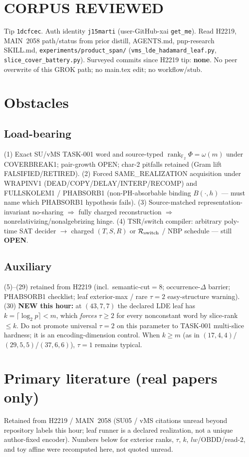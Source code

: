 \documentclass[11pt]{article}
\begin{document}
\section*{CORPUS REVIEWED}
Tip \texttt{1dcfcec}. Auth identity \texttt{j15marti} (user-GitHub-xai \texttt{get\_me}).
Read H2219, MAIN~2058 path/status from prior distill, AGENTS.md, pnp-research SKILL.md,
\texttt{experiments/product\_span/} (\texttt{vms\_lde\_hadamard\_leaf.py},
\texttt{slice\_cover\_battery.py}).
Surveyed commits since H2219 tip: \textbf{none}.
No peer overwrite of this GROK path; no main.tex edit; no workflow/stub.

\section*{Obstacles}
\subsection*{Load-bearing}
(1) Exact SU/vMS TASK-001 word and source-typed
$\operatorname{rank}_{\mathbb F_2}\Phi=\omega(m)$ under COVERBREAK1; pair-growth OPEN;
char-$2$ pitfalls retained (Gram lift FALSIFIED/RETIRED).
(2) Forced SAME\_REALIZATION acquisition under WRAPINV1
(DEAD/COPY/DELAY/INTERP/RECOMP) and FULLSKOLEM1 / PHABSORB1
(non-PH-absorbable binding $B(\cdot,h)$ --- must name which PHABSORB1 hypothesis fails).
(3) Source-matched representation-invariant no-sharing $\Rightarrow$ fully charged reconstruction
$\Rightarrow$ nonrelativizing/nonalgebrizing hinge.
(4) TSR/switch compiler: arbitrary poly-time SAT decider $\to$ charged $(T,S,R)$ or
$\mathcal R_{\rm switch}$ / NBP schedule --- still \textbf{OPEN}.

\subsection*{Auxiliary}
(5)--(29) retained from H2219 (incl.\ semantic-cut$=8$; occurrence-$\Delta$ barrier;
PHABSORB1 checklist; leaf exterior-max / rare $\tau{=}2$ easy-structure warning).
(30) \textbf{NEW this hour:} at $(43,7,7)$ the declared LDE leaf has
$k=\lceil\log_2 p\rceil < m$, which \emph{forces} $\tau\ge 2$ for every nonconstant word
by slice-rank $\le k$. Do not promote universal $\tau{=}2$ on this parameter to
TASK-001 multi-slice hardness; it is an encoding-dimension control. When $k\ge m$
(as in $(17,4,4)$/$(29,5,5)$/$(37,6,6)$), $\tau{=}1$ remains typical.

\section*{Primary literature (real papers only)}
Retained from H2219 / MAIN~2058 (SU05 / vMS citations unread beyond repository labels this hour;
leaf runner is a declared realization, not a unique author-fixed encoder).
Numbers below for exterior ranks, $\tau$, $k$, $lw$/OBDD/read-$2$, and toy affine
were recomputed here, not quoted unread.
\end{document}
